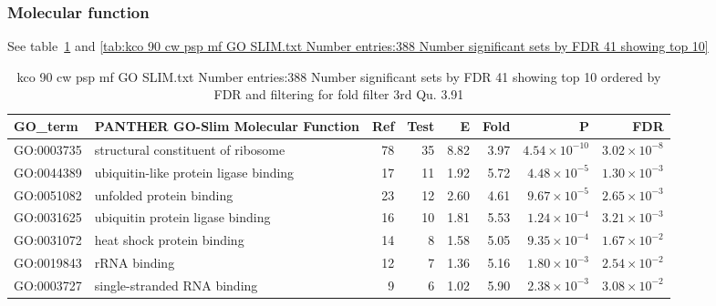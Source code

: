 \subsubsection{Molecular function}
See table~\ref{tab:kco 90 cw psp mf GO SLIM.txt Number entries:388 Number significant sets by FDR 41 showing top 10 ordered by FDR and filtering for fold filter 3rd Qu. 3.91} and \ref{tab:kco 90 cw psp mf GO SLIM.txt Number entries:388 Number significant sets by FDR 41 showing top 10}
\begin{table}[ht]
\centering
\begin{tabular}{llrrrrrr}
  \hline
GO\_term & PANTHER GO-Slim Molecular Function & Ref & Test & E & Fold & P & FDR \\ 
  \hline
GO:0003735 & structural constituent of ribosome  & 78 & 35 & 8.82 & 3.97 & $4.54 \times 10^{-10}$ & $3.02 \times 10^{-8}$ \\ 
  GO:0044389 & ubiquitin-like protein ligase binding  & 17 & 11 & 1.92 & 5.72 & $4.48 \times 10^{-5}$ & $1.30 \times 10^{-3}$ \\ 
  GO:0051082 & unfolded protein binding  & 23 & 12 & 2.60 & 4.61 & $9.67 \times 10^{-5}$ & $2.65 \times 10^{-3}$ \\ 
  GO:0031625 & ubiquitin protein ligase binding  & 16 & 10 & 1.81 & 5.53 & $1.24 \times 10^{-4}$ & $3.21 \times 10^{-3}$ \\ 
  GO:0031072 & heat shock protein binding  & 14 & 8 & 1.58 & 5.05 & $9.35 \times 10^{-4}$ & $1.67 \times 10^{-2}$ \\ 
  GO:0019843 & rRNA binding  & 12 & 7 & 1.36 & 5.16 & $1.80 \times 10^{-3}$ & $2.54 \times 10^{-2}$ \\ 
  GO:0003727 & single-stranded RNA binding  & 9 & 6 & 1.02 & 5.90 & $2.38 \times 10^{-3}$ & $3.08 \times 10^{-2}$ \\ 
  \hline
\end{tabular}
\caption{kco 90 cw psp mf GO SLIM.txt Number entries:388 Number significant sets by FDR 41 showing top 10 ordered by FDR and filtering for fold filter 3rd Qu. 3.91} 
\label{tab:kco 90 cw psp mf GO SLIM.txt Number entries:388 Number significant sets by FDR 41 showing top 10 ordered by FDR and filtering for fold filter 3rd Qu. 3.91}
\end{table}
